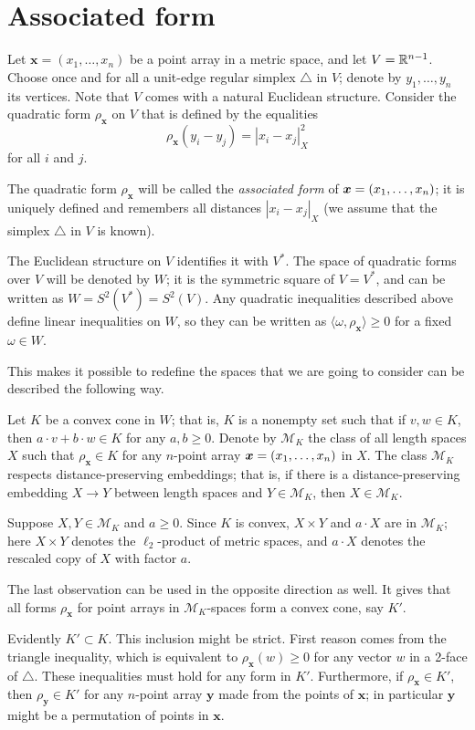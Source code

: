 \documentclass[a4paper,10pt]{article}
\begin{document}
\section{Associated form}\label{Associated form}
Let $\bm{x}=(x_1,\dots,x_n)$ be a point array in a metric space, and let $V\z=\RR^{n-1}$.
Choose once and for all a unit-edge regular simplex $\triangle$ in $V$; denote by $y_1,\dots,y_n$ its vertices.
Note that $V$ comes with a natural Euclidean structure.
Consider the quadratic form $\rho_{\bm{x}}$ on $V$ that is defined by the equalities
\[\rho_{\bm{x}}(y_i-y_j)=|x_i-x_j|^2_X\]
for all $i$ and $j$.

The quadratic form $\rho_{\bm{x}}$ will be called the \emph{associated form} of $\bm{x}=(x_1,\z\dots,x_n)$;
it is uniquely defined and remembers all distances $|x_i-x_j|_X$
(we assume that the simplex $\triangle$ in $V$ is known).

The Euclidean structure on $V$ identifies it with $V^*$.
The space of quadratic forms over $V$ will be denoted by $W$;
it is the symmetric square of $V=V^*$, and can be written as $W=S^2(V^*)=S^2(V)$.
Any quadratic inequalities described above define linear inequalities on $W$, so they can be written as $\langle\omega,\rho_{\bm{x}}\rangle\ge 0$ for a fixed $\omega\in W$.

This makes it possible to redefine the spaces that we are going to consider can be described the following way.

Let $K$ be a convex cone in $W$;
that is, $K$ is a nonempty set such that if $v,w\in K$, then $a\cdot v+b\cdot w\in K$ for any $a,b\ge0$.
Denote by $\mathcal{M}_K$ the class of all length spaces $X$ such that
$\rho_{\bm{x}}\in K$ for any $n$-point array $\bm{x}\z=(x_1,\dots,x_n)$ in $X$.
The class $\mathcal{M}_K$ respects distance-preserving embeddings; that is,
if there is a distance-preserving embedding $X\to Y$ between length spaces and $Y \in  \mathcal{M}_K$, then $X\in \mathcal{M}_K$.

Suppose $X,Y\in  \mathcal{M}_K$ and $a\ge 0$.
Since $K$ is convex,  $X\times Y$ and $a\cdot X$ are in $\mathcal{M}_K$;
here $X\times Y$ denotes the $\ell_2$-product of metric spaces, and
$a\cdot X$ denotes the rescaled copy of $X$ with factor $a$.

The last observation can be used in the opposite direction as well.
It gives that all forms $\rho_{\bm{x}}$ for point arrays in $\mathcal{M}_K$-spaces form a convex cone, say $K'$.

Evidently $K'\subset K$.
This inclusion might be strict.
First reason comes from the triangle inequality, which is equivalent to $\rho_{\bm{x}}(w)\ge 0$ for any vector $w$ in a 2-face of $\triangle$.
These inequalities must hold for any form in $K'$.
Furthermore, if $\rho_{\bm{x}}\in K'$, then $\rho_{\bm{y}}\in K'$ for any $n$-point array $\bm{y}$ made from the points of $\bm{x}$; in particular $\bm{y}$ might be a permutation of points in $\bm{x}$.
\end{document}

